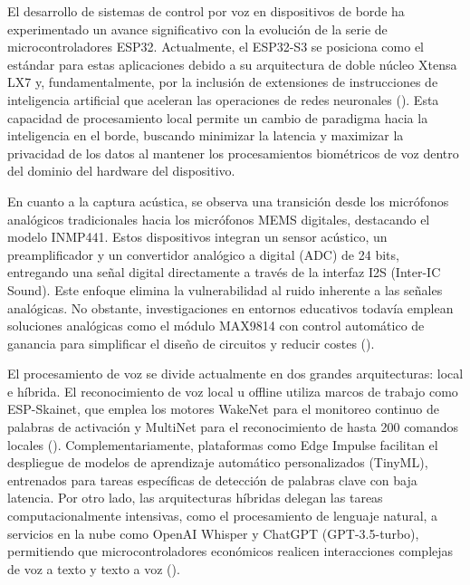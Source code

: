 El desarrollo de sistemas de control por voz en dispositivos de borde ha experimentado un
avance significativo con la evolución de la serie de microcontroladores ESP32. Actualmente,
el ESP32-S3 se posiciona como el estándar para estas aplicaciones debido a su arquitectura de
doble núcleo Xtensa LX7 y, fundamentalmente, por la inclusión de extensiones de
instrucciones de inteligencia artificial que aceleran las operaciones de redes neuronales
(\cite{kumar}). Esta capacidad de procesamiento local permite un cambio de paradigma hacia
la inteligencia en el borde, buscando minimizar la latencia y maximizar la privacidad de los
datos al mantener los procesamientos biométricos de voz dentro del dominio del hardware del
dispositivo.

En cuanto a la captura acústica, se observa una transición desde los micrófonos analógicos
tradicionales hacia los micrófonos MEMS digitales, destacando el modelo INMP441. Estos
dispositivos integran un sensor acústico, un preamplificador y un convertidor analógico a
digital (ADC) de 24 bits, entregando una señal digital directamente a través de la interfaz I2S
(Inter-IC Sound). Este enfoque elimina la vulnerabilidad al ruido inherente a las señales
analógicas. No obstante, investigaciones en entornos educativos todavía emplean soluciones
analógicas como el módulo MAX9814 con control automático de ganancia para simplificar el
diseño de circuitos y reducir costes (\cite{nguyen}).

El procesamiento de voz se divide actualmente en dos grandes arquitecturas: local e
híbrida. El reconocimiento de voz local u offline utiliza marcos de trabajo como ESP-Skainet,
que emplea los motores WakeNet para el monitoreo continuo de palabras de activación y
MultiNet para el reconocimiento de hasta 200 comandos locales (\cite{joseph}).
Complementariamente, plataformas como Edge Impulse facilitan el despliegue de modelos de
aprendizaje automático personalizados (TinyML), entrenados para tareas específicas de
detección de palabras clave con baja latencia. Por otro lado, las arquitecturas híbridas delegan
las tareas computacionalmente intensivas, como el procesamiento de lenguaje natural, a
servicios en la nube como OpenAI Whisper y ChatGPT (GPT-3.5-turbo), permitiendo que
microcontroladores económicos realicen interacciones complejas de voz a texto y texto a voz
(\cite{nguyen}). 

